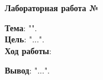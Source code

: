 \documentclass[12pt, a4paper, simple]{eskdtext}
\begin{document}
    \begin{ESKDtitlePage}
        
    \end{ESKDtitlePage}

    \begin{center}
        \textbf{Лабораторная работа №\titlePageLabNumber}\\
    \end{center}

    \textbf{Тема}: "\titlePageTopic".\\

    \textbf{Цель}: "...".\\

    \textbf{Ход работы}:

    

    \textbf{Вывод}: "...".\\
\end{document}
